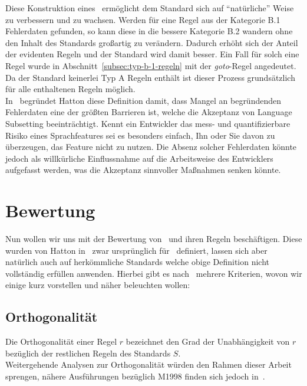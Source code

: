 \documentclass[a4paper,UKenglish,cleveref, autoref]{templates/lipics-v2019}
\begin{document}
    Diese Konstruktion eines \slss\ ermöglicht dem Standard sich auf \enquote{natürliche} Weise zu verbessern und zu wachsen.
    Werden für eine Regel aus der Kategorie B.1 Fehlerdaten gefunden, so kann diese in die bessere Kategorie
    B.2 wandern ohne den Inhalt des Standards großartig zu verändern.
    Dadurch erhöht sich der Anteil der evidenten Regeln und der Standard wird damit besser.
    Ein Fall für solch eine Regel wurde in Abschnitt~\ref{subsec:typ-b-1-regeln} mit der \textit{goto}-Regel angedeutet.
    Da der Standard keinerlei Typ A Regeln enthält ist dieser Prozess grundsätzlich für alle enthaltenen Regeln möglich.\\
    In~\cite{hatton2004safer} begründet Hatton diese Definition damit, dass Mangel an begründenden Fehlerdaten eine der
    größten Barrieren ist, welche die Akzeptanz von Language Subsetting beeinträchtigt.
    Kennt ein Entwickler das mess- und quantifizierbare Risiko eines Sprachfeatures sei es besonders einfach, Ihn oder Sie
    davon zu überzeugen, das Feature nicht zu nutzen.
    Die Absenz solcher Fehlerdaten könnte jedoch als willkürliche Einflussnahme auf die Arbeitsweise des Entwicklers
    aufgefasst werden, was die Akzeptanz sinnvoller Maßnahmen senken könnte.
    
    \section{Bewertung}
    \label{sec:bewertung}

    Nun wollen wir uns mit der Bewertung von \sqss\ und ihren Regeln beschäftigen.
    Diese wurden von Hatton in~\cite{hatton2004safer} zwar ursprünglich für \slss\ definiert, lassen sich aber natürlich
    auch auf herkömmliche Standards welche obige Definition nicht vollständig erfüllen anwenden.
    Hierbei gibt es nach~\cite{hatton2004safer} mehrere Kriterien, wovon wir einige kurz vorstellen und näher beleuchten wollen:

    \subsection{Orthogonalität}
    \label{subsec:orthogonalität}
    Die Orthogonalität einer Regel $r$ bezeichnet den Grad der Unabhängigkeit von $r$ bezüglich der restlichen Regeln
    des Standards $S$.\\
    Weitergehende Analysen zur Orthogonalität würden den Rahmen dieser Arbeit sprengen, nähere Ausführungen bezüglich
    M1998 finden sich jedoch in~\cite{hatton2004safer}.
\end{document}
